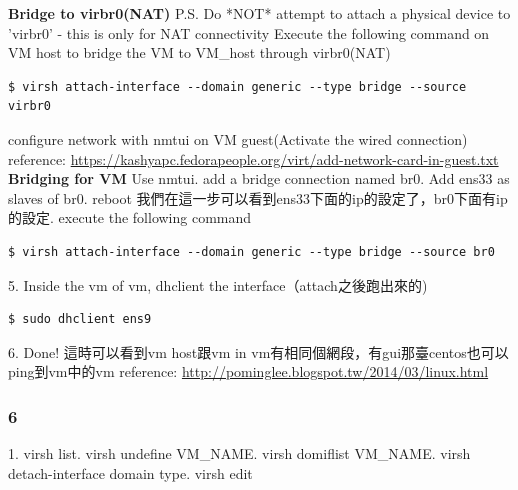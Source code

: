 \documentclass{article}
\begin{document}
\textbf{Bridge to virbr0(NAT)}\newline
P.S.  Do *NOT* attempt to attach a physical device to 'virbr0' - this is only for NAT connectivity\newline
Execute the following command on VM host to bridge the VM to VM\_host through virbr0(NAT)
\begin{verbatim}
$ virsh attach-interface --domain generic --type bridge --source virbr0
\end{verbatim}
configure network with nmtui on VM guest(Activate the wired connection)\newline
reference: \url{https://kashyapc.fedorapeople.org/virt/add-network-card-in-guest.txt}\newline
\textbf{Bridging for VM}\newline
Use nmtui. add a bridge connection named br0. Add ens33 as slaves of br0. reboot\newline
我們在這一步可以看到ens33下面的ip的設定了，br0下面有ip的設定. execute the following command
\begin{verbatim}
$ virsh attach-interface --domain generic --type bridge --source br0
\end{verbatim}
5. Inside the vm of vm, dhclient the interface（attach之後跑出來的)
\begin{verbatim}
$ sudo dhclient ens9
\end{verbatim}
6. Done!\newline
這時可以看到vm host跟vm in vm有相同個網段，有gui那臺centos也可以ping到vm中的vm\newline
reference: \url{http://pominglee.blogspot.tw/2014/03/linux.html}
    \subsubsection{6}

1. virsh list. virsh undefine VM\_NAME. virsh domiflist VM\_NAME. virsh detach-interface domain type. virsh edit \newline
\end{document}
